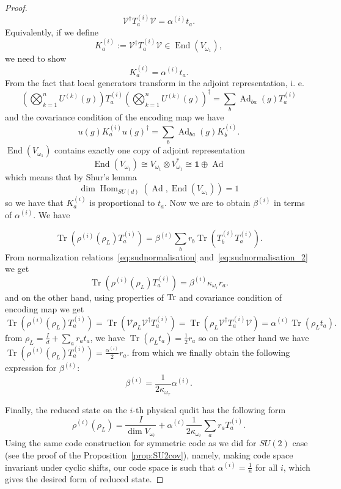 \documentclass[10pt,twocolumn,superscriptaddress,aps,amsmath,amssymb,citeautoscript,floatfix,prx]{revtex4-2}
\theoremstyle{plain}
\theoremstyle{plain}
\theoremstyle{plain}
\theoremstyle{plain}
\theoremstyle{plain}
\theoremstyle{plain}
\theoremstyle{plain}
\theoremstyle{definition}
\theoremstyle{plain}
\begin{document}
\begin{appendix}
\begin{proof}
\[
\mathcal{V}^{\dagger} T_a^{(i)} \mathcal{V}=\alpha^{(i)} t_a.
\]
Equivalently, if we define
\begin{equation}\label{eq:Vt_aV}
     K_a^{(i)}:=\mathcal{V}^{\dagger} T_a^{(i)} \mathcal{V} \in \operatorname{End}\left(V_{\omega_1}\right),
\end{equation}
we need to show
\[
    K_a^{(i)}=\alpha^{(i)} t_a.
\]
From the fact that local generators transform in the adjoint representation, i. e.
\[
     \left(\bigotimes_{k=1}^n U^{(k)}(g)\right) T_a^{(i)} \left(\bigotimes_{k=1}^n U^{(k)}(g)\right)^{\dagger}=\sum_b \operatorname{Ad}_{b a}(g) T_a^{(i)}
\]
and the covariance condition of the encoding map we have
\[
     u(g) K_a^{(i)} u(g)^{\dagger}=\sum_b \operatorname{Ad}_{b a}(g) K_b^{(i)}.
\]
$\operatorname{End}\left(V_{\omega_1}\right)$ contains exactly one copy of adjoint representation
\[
     \operatorname{End}\left(V_{\omega_1}\right) \cong V_{\omega_1} \otimes V_{\omega_1}^* \cong \mathbf{1} \oplus \operatorname{Ad}
\]
which means that by Shur's lemma
\[
     \operatorname{dim} \operatorname{Hom}_{S U(d)}\left(\operatorname{Ad}, \operatorname{End}\left(V_{\omega_1}\right)\right)=1
\]
so we have that $K_a^{(i)}$ is proportional to $t_a$. Now we are to obtain $\beta^{(i)}$ in terms of $\alpha^{(i)}$. We have

\[
     \operatorname{Tr}\left(\rho^{(i)}\left(\rho_L\right) T_a^{(i)}\right)=\beta^{(i)} \sum_b r_b \operatorname{Tr}\left(T_b^{(i)} T_a^{(i)}\right) .
\]
From normalization relations~\eqref{eq:sudnormalisation} and~\eqref{eq:sudnormalisation_2} we get
\[
     \operatorname{Tr}\left(\rho^{(i)}\left(\rho_L\right) T_a^{(i)}\right)=\beta^{(i)} \kappa_{\omega_r} r_a .
\]
and on the other hand, using properties of $\Tr$ and covariance condition of encoding map we get
\[
     \operatorname{Tr}\left(\rho^{(i)}\left(\rho_L\right) T_a^{(i)}\right)=\operatorname{Tr}\left(\mathcal{V} \rho_L \mathcal{V}^{\dagger} T_a^{(i)}\right)=
     \operatorname{Tr}\left(\rho_L \mathcal{V}^{\dagger} T_a^{(i)} \mathcal{V}\right)=\alpha^{(i)} \operatorname{Tr}\left(\rho_L t_a\right) .
\]
from $\rho_L=\frac{I}{d}+\sum_a r_a t_a$, we have
$
     \operatorname{Tr}\left(\rho_L t_a\right)=\frac{1}{2} r_a
$
so on the other hand we have
$
     \operatorname{Tr}\left(\rho^{(i)}\left(\rho_L\right) T_a^{(i)}\right)=\frac{\alpha^{(i)}}{2} r_a .
$
from which we finally obtain the following expression for $\beta^{(i)}$:
\[
     \beta^{(i)}=\frac{1}{2\kappa_{\omega_r}}\alpha^{(i)}  .
\]

Finally, the reduced state on the $i$-th physical qudit has the following form
\[
    \rho^{(i)}\left(\rho_L\right)=\frac{I}{\operatorname{dim} V_{\omega_r}}+\alpha^{(i)} \frac{1}{2\kappa_{\omega_r}} \sum_a r_a T_a^{(i)} .
\]
Using the same code construction for symmetric code as we did for $SU(2)$ case (see the proof of the Proposition~\ref{prop:SU2cov}), namely, making code space invariant under cyclic shifts, 
our code space is such that $\alpha^{(i)}=\frac{1}{n}$ for all $i$, which gives the desired form of reduced state.


\end{proof}
\end{appendix}
\end{document}

